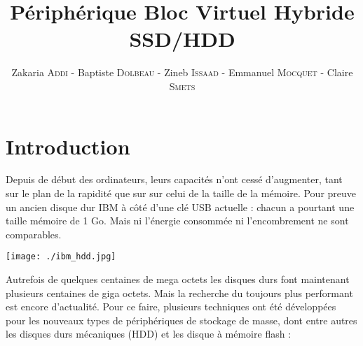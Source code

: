 \documentclass[a4paper,10pt]{article}
\title{Périphérique Bloc Virtuel Hybride SSD/HDD}
\author{Zakaria {\scshape{Addi}} - Baptiste {\scshape{Dolbeau}} - Zineb {\scshape{Issaad}} - Emmanuel {\scshape{Mocquet}} - Claire {\scshape{Smets}}}
\begin{document}
\maketitle

\clearpage
\tableofcontents
\clearpage

\pagebreak
\section{Introduction}
\begin{minipage}{0.55\linewidth}
Depuis de début des ordinateurs, leurs capacités n'ont cessé d'augmenter, tant sur le plan de la rapidité que sur sur celui de la taille de la mémoire. Pour 
preuve un ancien disque dur IBM à côté d'une clé USB actuelle : chacun a pourtant une taille mémoire de 1 Go. Mais ni l'énergie consommée ni l'encombrement 
ne sont comparables.\\
\end{minipage}\hfill
\begin{minipage}{0.4\linewidth}
\begin{flushright}
\texttt{[image: ./ibm\_hdd.jpg]}\end{flushright}
\end{minipage}
Autrefois de quelques centaines de mega octets les disques durs font maintenant plusieurs centaines de giga octets. Mais la recherche du toujours plus 
performant est encore d'actualité. Pour ce faire, plusieurs techniques ont été développées pour les nouveaux types de périphériques de stockage de masse, 
dont entre autres les disques durs mécaniques (HDD) et les disque à mémoire flash : \bigskip\\
\end{document}
